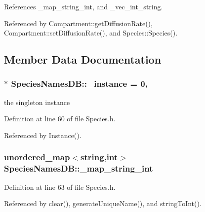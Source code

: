 References \+\_\+map\+\_\+string\+\_\+int, and \+\_\+vec\+\_\+int\+\_\+string.



Referenced by Compartment\+::get\+Diffusion\+Rate(), Compartment\+::set\+Diffusion\+Rate(), and Species\+::\+Species().



\subsection{Member Data Documentation}
\hypertarget{classSpeciesNamesDB_aa47f96058594e809c9da48eef415ce8b}{
\subsubsection[{\+\_\+instance}]{ $\ast$ Species\+Names\+D\+B\+::\+\_\+instance = 0\hspace{0.3cm}{\ttfamily [static]}, {\ttfamily [private]}}}\label{classSpeciesNamesDB_aa47f96058594e809c9da48eef415ce8b}


the singleton instance 



Definition at line 60 of file Species.\+h.



Referenced by Instance().

\hypertarget{classSpeciesNamesDB_a102ccdb08c93602260cff62cbf7d712a}{
\subsubsection[{\+\_\+map\+\_\+string\+\_\+int}]{\setlength{\rightskip}{0pt plus 5cm}unordered\+\_\+map$<$string,int$>$ Species\+Names\+D\+B\+::\+\_\+map\+\_\+string\+\_\+int\hspace{0.3cm}{\ttfamily [private]}}}\label{classSpeciesNamesDB_a102ccdb08c93602260cff62cbf7d712a}


Definition at line 63 of file Species.\+h.



Referenced by clear(), generate\+Unique\+Name(), and string\+To\+Int().

